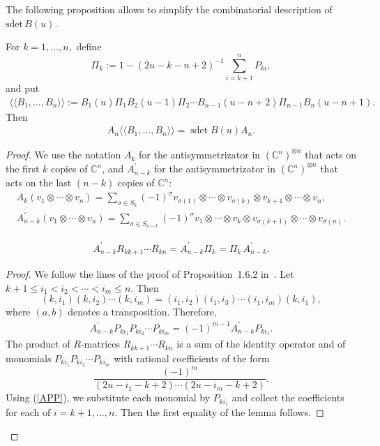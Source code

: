 \documentclass[pdftex]{sigma}
\newcommand{\CC}{\mathbb C}    %
\begin{document}
The following proposition allows to simplify the combinatorial description of $\text{sdet}\, B(u)$.
\begin{proposition} \label{new}
For $k=1,\dots, n,$ define
\[
\Pi_k:=1-{(2u-k-n+2)^{-1}}\sum_{i=k+1}^{n}P_{ki},
\]
and put
\begin{gather*}
\langle \langle B_1,\dots, B_n
\rangle \rangle :=
B_1(u) \Pi_1B_2(u-1)\Pi_2\cdots B_{n-1}(u-n+2)\Pi_{n-1}B_n(u-n+1).
\end{gather*}
Then
\begin{gather*}
A_n\langle \langle B_1,\dots, B_n
\rangle \rangle =\operatorname{sdet}B(u)A_n.
\end{gather*}
\end{proposition}
\begin{proof}
We use the notation  $A_k$  for the antisymmetrizator in  $(\CC^n)^{\otimes n}$ that acts on the f\/irst $k$ copies of $\CC^n$, and
$A^{\prime}_{n-k}$  for  the antisymmetrizator  in   $(\CC^n)^{\otimes n}$ that acts on  the last $(n-k)$ copies of $\CC^n$:
\begin{gather*}
A_k (v_1\otimes \cdots\otimes v_n)=\sum_{\sigma\in S_k} (-1)^{\sigma}
v_{\sigma(1)}\otimes \cdots \otimes  v_{\sigma(k) }\otimes v_{k+1}\otimes\cdots
\otimes v_{n},
\\
A^\prime_{n-k} (v_1\otimes \cdots\otimes v_n)=\sum_{\sigma\in S_{n-k}} (-1)^{\sigma}
v_{1}\otimes \cdots \otimes v_{k }\otimes v_{\sigma(k+1)}\otimes\cdots
\otimes v_{\sigma(n)}.
\end{gather*}


\begin{lemma} \label{lem_ARR}
\begin{gather}\label{ARR}
A^\prime_{n-k} R_{kk+1}\cdots R_{kn} =
A^\prime_{n-k} \Pi_k=
\Pi_k\,A^\prime_{n-k}.
\end{gather}
\end{lemma}
\begin{proof} We follow the lines of the proof of Proposition~1.6.2 in~\cite{Mol1}. Let  $k+1\le i_1< i_2< \cdots < i_m\le n$. Then
\[
(k,i_1)(k,i_2)\cdots (k,i_m)=(i_1,i_2)(i_1,i_3)\cdots (i_{1},i_m)(k,i_1),
\]
where $(a,b)$   denotes  a  transposition.
Therefore,
\begin{gather}\label{APP}
A^\prime_{n-k}P_{ki_1}P_{ki_2}\cdots P_{ki_m}=(-1)^{m-1}A^\prime_{n-k}P_{ki_1}.
\end{gather}
The product of $R$-matrices $R_{kk+1}\cdots R_{kn}$  is a sum of  the identity operator and of monomials $P_{ki_1}P_{ki_2}\cdots P_{ki_m}$ with rational coef\/f\/icients of the form
\[
\frac{(-1)^m}{(2u-i_1-k+2)\cdots (2u-i_m-k+2)}.
\]
Using (\ref{APP}), we substitute each monomial by  $P_{ki_1}$   and   collect the coef\/f\/icients  for each  of $i=k+1,\dots, n$. Then the  f\/irst equality of the lemma follows.



\end{proof}
\end{proof}
\end{document}
